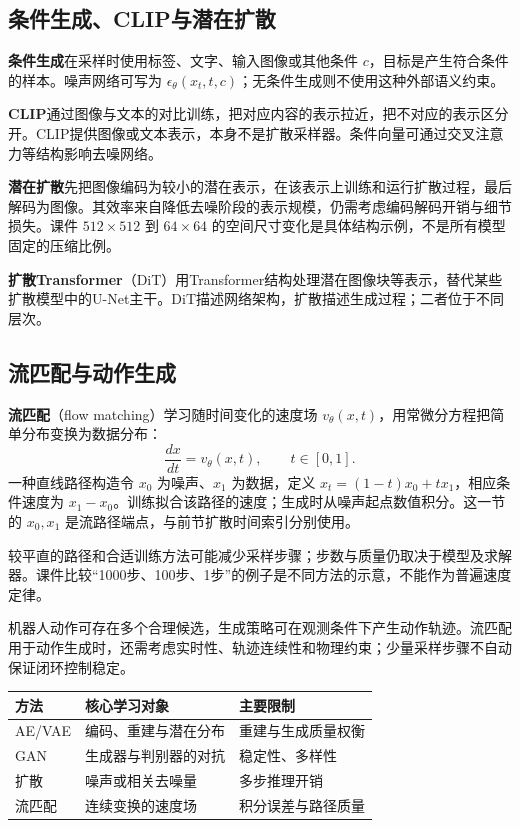 \documentclass[UTF8,fontset=none,zihao=-4,a4paper]{ctexart}
\newcommand{\term}[1]{\textbf{#1}}
\begin{document}
\subsection{条件生成、CLIP与潜在扩散}
\term{条件生成}在采样时使用标签、文字、输入图像或其他条件 $c$，目标是产生符合条件的样本。噪声网络可写为 $\epsilon_\theta(x_t,t,c)$；无条件生成则不使用这种外部语义约束。

\term{CLIP}通过图像与文本的对比训练，把对应内容的表示拉近，把不对应的表示区分开。CLIP提供图像或文本表示，本身不是扩散采样器。条件向量可通过交叉注意力等结构影响去噪网络。

\term{潜在扩散}先把图像编码为较小的潜在表示，在该表示上训练和运行扩散过程，最后解码为图像。其效率来自降低去噪阶段的表示规模，仍需考虑编码解码开销与细节损失。课件 $512\times512$ 到 $64\times64$ 的空间尺寸变化是具体结构示例，不是所有模型固定的压缩比例。

\term{扩散Transformer}（DiT）用Transformer结构处理潜在图像块等表示，替代某些扩散模型中的U-Net主干。DiT描述网络架构，扩散描述生成过程；二者位于不同层次。

\subsection{流匹配与动作生成}
\term{流匹配}（flow matching）学习随时间变化的速度场 $v_\theta(x,t)$，用常微分方程把简单分布变换为数据分布：
\[
\frac{dx}{dt}=v_\theta(x,t),\qquad t\in[0,1].
\]
一种直线路径构造令 $x_0$ 为噪声、$x_1$ 为数据，定义 $x_t=(1-t)x_0+tx_1$，相应条件速度为 $x_1-x_0$。训练拟合该路径的速度；生成时从噪声起点数值积分。这一节的 $x_0,x_1$ 是流路径端点，与前节扩散时间索引分别使用。

较平直的路径和合适训练方法可能减少采样步骤；步数与质量仍取决于模型及求解器。课件比较“1000步、100步、1步”的例子是不同方法的示意，不能作为普遍速度定律。

机器人动作可存在多个合理候选，生成策略可在观测条件下产生动作轨迹。流匹配用于动作生成时，还需考虑实时性、轨迹连续性和物理约束；少量采样步骤不自动保证闭环控制稳定。

\begin{center}\begin{tabularx}{\linewidth}{lYY}
\toprule 方法 & 核心学习对象 & 主要限制\\\midrule
AE/VAE & 编码、重建与潜在分布 & 重建与生成质量权衡\\
GAN & 生成器与判别器的对抗 & 稳定性、多样性\\
扩散 & 噪声或相关去噪量 & 多步推理开销\\
流匹配 & 连续变换的速度场 & 积分误差与路径质量\\\bottomrule
\end{tabularx}\end{center}
\end{document}
